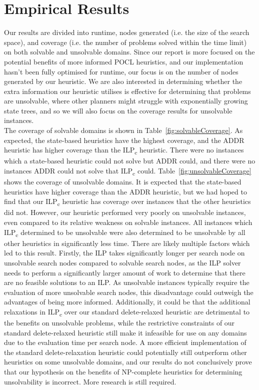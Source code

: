 \section{Empirical Results}


Our results are divided into runtime, nodes generated (i.e. the size of the search space), and coverage (i.e. the number of problems solved within the time limit) on both solvable and unsolvable domains. Since our report is more focused on the potential benefits of more informed POCL heuristics, and our implementation hasn't been fully optimised for runtime, our focus is on the number of nodes generated by our heuristic. We are also interested in determining whether the extra information our heuristic utilises is effective for determining that problems are unsolvable, where other planners might struggle with exponentially growing state trees, and so we will also focus on the coverage results for unsolvable instances.\\

The coverage of solvable domains is shown in Table~\ref{fig:solvableCoverage}. As expected, the state-based heuristics have the highest coverage, and the ADDR heuristic has higher coverage than the ILP\textsubscript{c} heuristic. There were no instances which a state-based heuristic could not solve but ADDR could, and there were no instances ADDR could not solve that ILP\textsubscript{c} could. Table~\ref{fig:unsolvableCoverage} shows the coverage of unsolvable domains. It is expected that the state-based heuristics have higher coverage than the ADDR heuristic, but we had hoped to find that our ILP\textsubscript{c} heuristic has coverage over instances that the other heuristics did not. However, our heuristic performed very poorly on unsolvable instances, even compared to its relative weakness on solvable instances. All instances which ILP\textsubscript{c} determined to be unsolvable were also determined to be unsolvable by all other heuristics in significantly less time. There are likely multiple factors which led to this result. Firstly, the ILP takes significantly longer per search node on unsolvable search nodes compared to solvable search nodes, as the ILP solver needs to perform a significantly larger amount of work to determine that there are no feasible solutions to an ILP. As unsolvable instances typically require the evaluation of more unsolvable search nodes, this disadvantage could outweigh the advantages of being more informed. Additionally, it could be that the additional relaxations in ILP\textsubscript{c} over our standard delete-relaxed heuristic are detrimental to the benefits on unsolvable problems, while the restrictive constraints of our standard delete-relaxed heuristic still make it infeasible for use on any domains due to the evaluation time per search node. A more efficient implementation of the standard delete-relaxation heuristic could potentially still outperform other heuristics on some unsolvable domains, and our results do not conclusively prove that our hypothesis on the benefits of NP-complete heuristics for determining unsolvability is incorrect. More research is still required.


